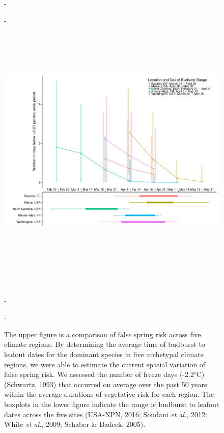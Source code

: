 \documentclass{article}\usepackage[]{graphicx}\usepackage[]{color}
\begin{document}
\begin{figure} [H] 
 -\begin{center}
 -\includegraphics[width=16cm, height=13cm]{..//figure/RegRisk_clean.pdf} 
 -\caption{The upper figure is a comparison of false spring risk across five climate regions. By determining the average time of budburst to leafout dates for the dominant species in five archetypal climate regions, we were able to estimate the current spatial variation of false spring risk. We assessed the number of freeze days (-2.2$^{\circ}$C) (Schwartz, 1993) that occurred on average over the past 50 years within the average durations of vegetative risk for each region. The boxplots in the lower figure indicate the range of budburst to leafout dates across the five sites (USA-NPN, 2016; Soudani \textit{et al.}, 2012; White \textit{et al.}, 2009; Schaber \& Badeck, 2005). }\label{fig:regional}  
 -\end{center}
 -\end{figure}
\end{document}
